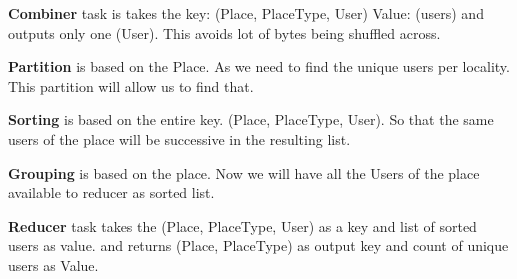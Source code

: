 	\textbf{Combiner} task is takes the key: (Place, PlaceType, User) Value: (users) and outputs only one (User). This avoids lot of bytes being shuffled across. 
	
	\textbf{Partition} is based on the Place. As we need to find the unique users per locality. This partition will allow us to find that. 
	
	\textbf{Sorting} is based on the entire key. (Place, PlaceType, User). So that the same users of the place will be successive in the resulting list. 
	
	\textbf{Grouping} is based on the place. Now we will have all the Users of the place available to reducer as sorted list. 
	
	\textbf{Reducer} task takes the (Place, PlaceType, User) as a key and list of sorted users as value. and returns (Place, PlaceType) as output key and count of unique users as Value.
	

